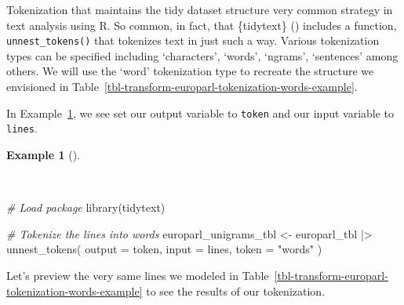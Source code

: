 \documentclass[
  letterpaper,
  krantz1]{latex/krantz-mod}
\newenvironment{Shaded}{\begin{snugshade}}{\end{snugshade}}
\newcommand{\AttributeTok}[1]{\textcolor[rgb]{0.00,0.00,0.00}{#1}}
\newcommand{\CommentTok}[1]{\textcolor[rgb]{0.00,0.00,0.00}{\textit{#1}}}
\newcommand{\FunctionTok}[1]{\textcolor[rgb]{0.00,0.00,0.00}{#1}}
\newcommand{\NormalTok}[1]{\textcolor[rgb]{0.00,0.00,0.00}{#1}}
\newcommand{\OtherTok}[1]{\textcolor[rgb]{0.00,0.00,0.00}{#1}}
\newcommand{\SpecialCharTok}[1]{\textcolor[rgb]{0.00,0.00,0.00}{#1}}
\newcommand{\StringTok}[1]{\textcolor[rgb]{0.00,0.00,0.00}{#1}}
\theoremstyle{definition}
\newtheorem{example}{Example}[chapter]
\theoremstyle{definition}
\theoremstyle{remark}
\begin{document}
Tokenization that maintains the tidy dataset structure very common
strategy in text analysis using R. So common, in fact, that \{tidytext\}
() includes a
function, \texttt{unnest\_tokens()} that tokenizes text in just such a
way. Various tokenization types can be specified including `characters',
`words', `ngrams', `sentences' among others. We will use the `word'
tokenization type to recreate the structure we envisioned in
Table~\ref{tbl-transform-europarl-tokenization-words-example}.

In Example~\ref{exm-transform-europarl-tokenization-words-tidytext}, we
see set our output variable to \texttt{token} and our input variable to
\texttt{lines}.

\begin{example}[]\protect\hypertarget{exm-transform-europarl-tokenization-words-tidytext}{}\label{exm-transform-europarl-tokenization-words-tidytext}

~

\begin{Shaded}
\begin{Highlighting}[numbers=left,,]
\CommentTok{\# Load package}
\FunctionTok{library}\NormalTok{(tidytext)}

\CommentTok{\# Tokenize the lines into words}
\NormalTok{europarl\_unigrams\_tbl }\OtherTok{\textless{}{-}}
\NormalTok{  europarl\_tbl }\SpecialCharTok{|\textgreater{}}
  \FunctionTok{unnest\_tokens}\NormalTok{(}
    \AttributeTok{output =}\NormalTok{ token,}
    \AttributeTok{input =}\NormalTok{ lines,}
    \AttributeTok{token =} \StringTok{"words"}
\NormalTok{  )}
\end{Highlighting}
\end{Shaded}

\end{example}

Let's preview the very same lines we modeled in
Table~\ref{tbl-transform-europarl-tokenization-words-example} to see the
results of our tokenization.
\end{document}

